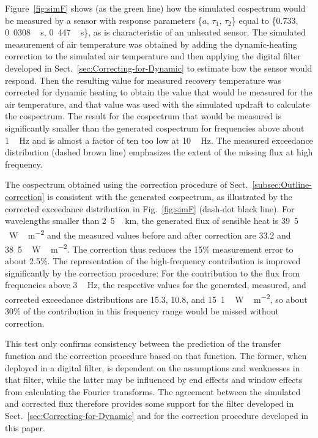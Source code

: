 \documentclass[amt, manuscript]{copernicus}
\begin{document}
Figure~\ref{fig:simF} shows (as the green line) how the simulated
cospectrum would be measured by a sensor with response parameters
\{\(a,\,\tau_{1},\,\tau_{2}\)\} equal to \{0.733, \unit{0.0308\,s},
\unit{0.447\,s}\}, as is characteristic of an unheated sensor. The
simulated measurement of air temperature was obtained by adding the
dynamic-heating correction to the simulated air temperature and then
applying the digital filter developed in
Sect.~\ref{sec:Correcting-for-Dynamic} to estimate how the sensor would
respond. Then the resulting value for measured recovery temperature was
corrected for dynamic heating to obtain the value that would be measured
for the air temperature, and that value was used with the simulated
updraft to calculate the cospectrum. The result for the cospectrum that
would be measured is significantly smaller than the generated cospectrum
for frequencies above about \unit{1\,Hz} and is almost a factor of ten
too low at \unit{10\,Hz}. The measured exceedance distribution (dashed
brown line) emphasizes the extent of the missing flux at high frequency.

The cospectrum obtained using the correction procedure of
Sect.~\ref{subsec:Outline-correction} is consistent with the generated
cospectrum, as illustrated by the corrected exceedance distribution in
Fig.~\ref{fig:simF} (dash-dot black line). For wavelengths smaller than
\unit{2.5\,km}, the generated flux of sensible heat is
\unit{39.5\,W\,m^{-2}} and the measured values before and after
correction are 33.2 and \unit{38.5\,W\,m^{-2}}. The correction thus
reduces the 15\% measurement error to about 2.5\%. The representation of
the high-frequency contribution is improved significantly by the
correction procedure: For the contribution to the flux from frequencies
above \unit{3\,Hz}, the respective values for the generated, measured,
and corrected exceedance distributions are 15.3, 10.8, and
\unit{15.1\,W\,m^{-2}}, so about 30\% of the contribution in this
frequency range would be missed without correction.

This test only confirms consistency between the prediction of the
transfer function and the correction procedure based on that function.
The former, when deployed in a digital filter, is dependent on the
assumptions and weaknesses in that filter, while the latter may be
influenced by end effects and window effects from calculating the
Fourier transforms. The agreement between the simulated and corrected
flux therefore provides some support for the filter developed in
Sect.~\ref{sec:Correcting-for-Dynamic} and for the correction procedure
developed in this paper.
\end{document}
